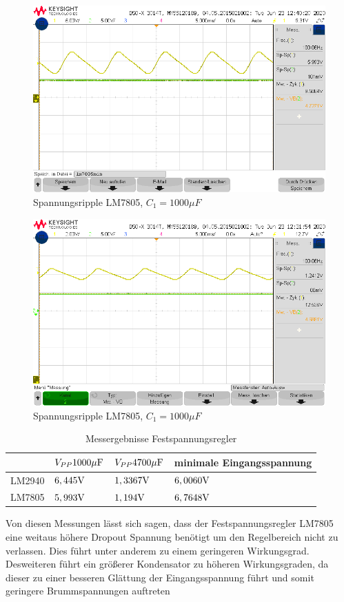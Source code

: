\begin{figure}
    \centering
    \includegraphics[width = \costumPicWidth]{Lab_5/Messungen/lm7805min.png}
    \caption{Spannungsripple LM7805, $C_1=1000\mu F$}
    \label{fig:my_label}
\end{figure}
\begin{figure}
    \centering
    \includegraphics[width = \costumPicWidth]{Lab_5/Messungen/lm7805.4700u.png}
    \caption{Spannungsripple LM7805, $C_1=1000\mu F$}
    \label{fig:my_label}
\end{figure}
\begin{table}[H]
\centering
\caption{Messergebnisse Festspannungsregler}
\label{tab:res_Festu_reg}
\begin{tabular}{|l|l|l|l|}
\hline
\rowcolor[HTML]{9B9B9B} 
       & $V_{PP} 1000\mu\text{F}$ & $V_{PP} 4700\mu\text{F}$ & minimale Eingangsspannung \\ \hline
LM2940 & $6,445\text{V}$        & $1,3367\text{V}$       & $6,0060\text{V}$                \\ \hline
LM7805 & $5,993\text{V}$        & $1,194\text{V}$        & $6,7648\text{V}$                \\ \hline
\end{tabular}
\end{table}
Von diesen Messungen lässt sich sagen, dass der Festspannungsregler LM7805 eine weitaus höhere Dropout Spannung benötigt um den Regelbereich nicht zu verlassen. Dies führt unter anderem zu einem geringeren Wirkungsgrad. Desweiteren führt ein größerer Kondensator zu höheren Wirkungsgraden, da dieser zu einer besseren Glättung der Eingangsspannung führt und somit geringere Brummspannungen auftreten

